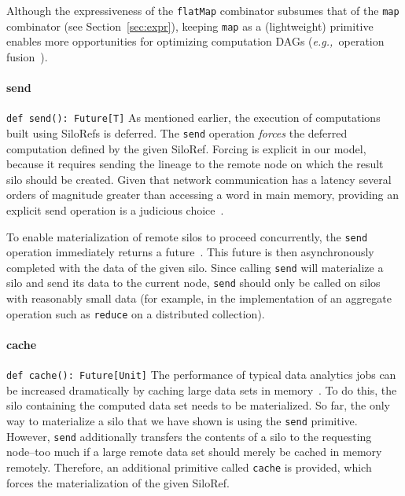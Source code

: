 \documentclass[10pt]{sigplanconf}
\theoremstyle{definition}
\theoremstyle{definition}
\newcommand{\eg}{{\em e.g.,~}}
\begin{document}
Although the expressiveness of the \verb|flatMap| combinator subsumes that of
the \verb|map| combinator (see Section~\ref{sec:expr}), keeping \verb|map| as a
(lightweight) primitive enables more opportunities for optimizing computation
DAGs (\eg operation fusion~\cite{FlumeJava}).

\paragraph{send}%
%
\texttt{def send(): Future[T]} \newline
%
As mentioned earlier, the execution of computations built using SiloRefs is
deferred. The \verb|send| operation {\em forces} the deferred computation defined
by the given SiloRef.  Forcing is explicit in our model, because it requires
sending the lineage to the remote node on which the result silo should be
created. Given that network communication has a latency several orders of
magnitude greater than accessing a word in main memory, providing an explicit
send operation is a judicious choice~\cite{ANoteDistComp}.

To enable materialization of remote silos to proceed concurrently, the
\verb|send| operation immediately returns a future~\cite{Futures}. This future
is then asynchronously completed with the data of the given silo. Since calling
\verb|send| will materialize a silo and send its data to the current node,
\verb|send| should only be called on silos with reasonably small data (for
example, in the implementation of an aggregate operation such as \verb|reduce|
on a distributed collection).

\paragraph{cache}%
%
\texttt{def cache(): Future[Unit]} \newline
%
The performance of typical data analytics jobs can be increased dramatically by
caching large data sets in memory~\cite{Spark}. To do this, the silo containing
the computed data set needs to be materialized. So far, the only way to
materialize a silo that we have shown is using the \verb|send| primitive.
However, \verb|send| additionally transfers the contents of a silo to the
requesting node--too much if a large remote data set should merely be cached in
memory remotely.  Therefore, an additional primitive called \verb|cache| is
provided, which forces the materialization of the given SiloRef.

\end{document}
